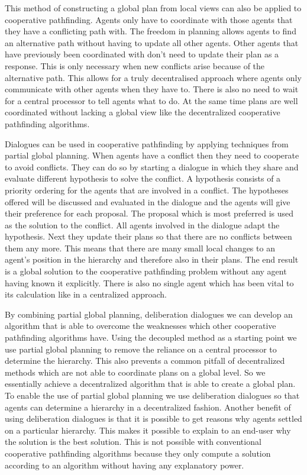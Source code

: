 This method of constructing a global plan from local views can also be applied
to cooperative pathfinding. Agents only have to coordinate with those agents
that they have a conflicting path with. The freedom in planning allows agents
to find an alternative path without having to update all other agents. Other
agents that have previously been coordinated with don't need to update their
plan as a response. This is only necessary when new conflicts arise because of
the alternative path. This allows for a truly decentralised approach where
agents  only communicate with other agents when they have to. There is also no
need to wait for a central processor to tell agents what to do. At the same
time plans are well coordinated without lacking a global view like the
decentralized cooperative pathfinding algorithms.

Dialogues can be used in cooperative pathfinding by applying techniques from
partial global planning. When agents have a conflict then they need to
cooperate to avoid conflicts. They can do so by starting a dialogue in which
they share and evaluate different hypothesis to solve the conflict. A
hypothesis consists of a priority ordering for the agents that are involved in
a conflict. The hypotheses offered will be discussed and evaluated in the
dialogue and the agents will give their preference for each proposal. The
proposal which is most preferred is used as the solution to the conflict. All
agents involved in the dialogue adapt the hypothesis. Next they update their
plans so that there are no conflicts between them any more. This means that
there are many small local changes to an agent's position in the hierarchy and
therefore also in their plans. The end result is a global solution to the
cooperative pathfinding problem without any agent having known it explicitly.
There is also no single agent which has been vital to its calculation like in a
centralized approach.

By combining partial global planning, deliberation dialogues we can develop
an algorithm that is able to overcome the weaknesses which other cooperative
pathfinding algorithms have. Using the decoupled method as a starting point we
use partial global planning to remove the reliance on a central processor to
determine the hierarchy. This also prevents a common pitfall of decentralized
methods which are not able to coordinate plans on a global level. So we
essentially achieve a decentralized algorithm that is able to create a global
plan. To enable the use of partial global planning we use deliberation
dialogues so that agents can determine a hierarchy in a decentralized fashion.
Another benefit of using deliberation dialogues is that it is possible to get
reasons why agents settled on a particular hierarchy. This makes it possible to
explain to an end-user why the solution is the best solution. This is not
possible with conventional cooperative pathfinding algorithms because they only
compute a solution according to an algorithm without having any explanatory
power.

